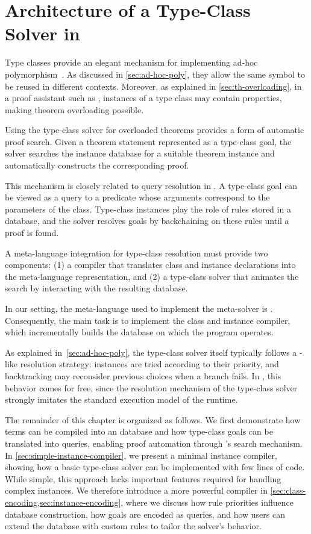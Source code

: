 \chapter{Architecture of a Type-Class Solver in \rocqelpi}
\label{chap:tc}

Type classes provide an elegant mechanism for implementing ad-hoc
polymorphism~\cite{wadler1989}. As discussed in
\cref{sec:ad-hoc-poly}, they allow the same symbol to be reused in
different contexts. Moreover, as explained in
\cref{sec:th-overloading}, in a proof assistant such as \rocq{},
instances of a type class may contain properties, making theorem
overloading possible.

Using the type-class solver for overloaded theorems provides a form of
automatic proof search. Given a theorem statement represented as a
type-class goal, the solver searches the instance database for a
suitable theorem instance and automatically constructs the corresponding
proof.

This mechanism is closely related to query resolution in \prolog{}. A
type-class goal can be viewed as a query to a predicate whose arguments
correspond to the parameters of the class. Type-class instances play the
role of rules stored in a database, and the solver resolves goals by
backchaining on these rules until a proof is found.

A meta-language integration for type-class resolution must provide two components:
(1) a compiler that translates \rocq class and instance declarations into the
meta-language representation, and (2) a type-class solver that animates the
search by interacting with the resulting database.

In our setting, the meta-language used to implement the meta-solver is
\elpi. Consequently, the main task is to implement the class and instance
compiler, which incrementally builds the database on which the \elpi program
operates.

As explained in~\cref{sec:ad-hoc-poly}, 
the type-class solver itself typically follows a \prolog-like resolution
strategy: instances are tried according to their priority, and backtracking
may reconsider previous choices when a branch fails. In \elpi, this behavior
comes for free, since the resolution mechanism of the type-class solver
strongly imitates the standard execution model of the \elpi runtime.

The remainder of this chapter is organized as follows. We first demonstrate how
\rocq terms can be compiled into an \elpi database and how type-class goals can
be translated into \elpi queries, enabling proof automation through \elpi's
search mechanism. In \cref{sec:simple-instance-compiler}, we present a minimal
instance compiler, showing how a basic type-class solver can be implemented with
few lines of code. While simple, this approach lacks important features required
for handling complex instances. We therefore introduce a more powerful
compiler in \cref{sec:class-encoding,sec:instance-encoding}, where we
discuss how rule priorities influence database construction, how \rocq goals are
encoded as \elpi queries, and how users can extend the database with custom
rules to tailor the solver's behavior.

